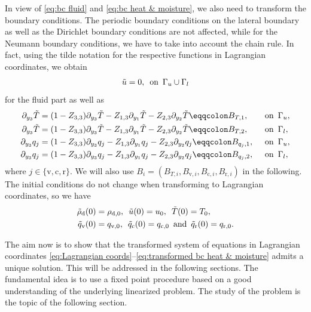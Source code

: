 \documentclass[10pt]{amsart}
\theoremstyle{plain}
\theoremstyle{definition}
\theoremstyle{thm}
\numberwithin{equation}{section}
\newcommand{\del}{\partial}
\newcommand{\Gal}{\Gamma_l}
\newcommand{\Gau}{\Gamma_u}
\newcommand{\tand}{\enspace \text{and} \enspace}
\newcommand{\ton}{\enspace \text{on} \enspace}
\newcommand{\rd}{\mathrm{d}}
\newcommand{\rr}{\mathrm{r}}
\newcommand{\rv}{\mathrm{v}}
\newcommand{\rc}{\mathrm{c}}
\newcommand{\trho}{\Tilde{\rho}}
\newcommand{\tu}{\Tilde{u}}
\newcommand{\tT}{\Tilde{T}}
\newcommand{\tq}{\Tilde{q}}
\begin{document}
In view of \eqref{eq:bc fluid} and \eqref{eq:bc heat & moisture}, we also need to transform the boundary conditions.
The periodic boundary conditions on the lateral boundary as well as the Dirichlet boundary conditions are not affected, while for the Neumann boundary conditions, we have to take into account the chain rule.
In fact, using the tilde notation for the respective functions in Lagrangian coordinates, we obtain 
\begin{equation}\label{eq:transformed bc fluid}
    \tu = 0, \ton \Gau \cup \Gal
\end{equation}
for the fluid part as well as 
\begin{equation}\label{eq:transformed bc heat & moisture}
    \begin{aligned}
        \del_{y_3} \tT
        &= (1-Z_{3,3}) \del_{y_3} \tT - Z_{1,3} \del_{y_1} \tT - Z_{2,3} \del_{y_2} \tT \eqqcolon B_{T,1}, &&\ton \Gau,\\
        \del_{y_3} \tT
        &=  (1-Z_{3,3}) \del_{y_3} \tT - Z_{1,3} \del_{y_1} \tT - Z_{2,3} \del_{y_2} \tT \eqqcolon B_{T,2}, &&\ton \Gal,\\
        \del_{y_3} q_j
        &=(1-Z_{3,3}) \del_{y_3} q_j - Z_{1,3} \del_{y_1} q_j - Z_{2,3} \del_{y_2} q_j \eqqcolon B_{q_j ,1}, &&\ton \Gau,\\
        \del_{y_3} q_j
        &= (1-Z_{3,3}) \del_{y_3} q_j - Z_{1,3} \del_{y_1} q_j - Z_{2,3} \del_{y_2} q_j \eqqcolon B_{q_j ,2}, &&\ton \Gal, 
    \end{aligned}
\end{equation}
where $j \in \{\rv,\rc,\rr\}$.
We will also use $B_i = (B_{T,i},B_{\rv,i},B_{\rc,i},B_{\rr,i})$ in the following.
The initial conditions do not change when transforming to Lagrangian coordinates, so we have
\begin{equation}\label{eq:init conds Lagrange}
    \begin{aligned}
        \trho_\rd(0) 
        &= \rho_{\rd,0}, \enspace \tu(0) = u_0, \enspace \tT(0) = T_0,\\
        \tq_\rv(0) 
        &= q_{\rv,0}, \enspace \tq_\rc(0) = q_{\rc,0} \tand \tq_\rr(0) = q_{\rr,0}.
    \end{aligned}
\end{equation}

The aim now is to show that the transformed system of equations in Lagrangian coordinates \eqref{eq:Lagrangian coords}--\eqref{eq:transformed bc heat & moisture} admits a unique solution.
This will be addressed in the following sections.
The fundamental idea is to use a fixed point procedure based on a good understanding of the underlying linearized problem.
The study of the problem is the topic of the following section.
\end{document}
